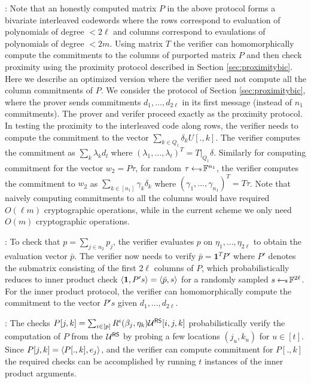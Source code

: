 : Note that an honestly computed
matrix $P$ in the above protocol forms a bivariate interleaved codewords where
the rows correspond to evaluation of polynomials of degree $<2\ell$ and columns
correspond to evaulations of polynomials of degree $<2m$. Using matrix $T$ the
verifier can homomorphically compute the commitments to the columns of
purported matrix $P$ and then check proximity using the proximity protocol
described in Section \ref{sec:proximitybic}. Here we describe an optimized
version where the verifier need not compute all the column commitments of $P$. 
We consider the protocol of Section \ref{sec:proximitybic}, where the prover
sends commitments $d_1,\ldots,d_{2\ell}$ in its first message (instead of $n_1$
commitments). The prover and verifer proceed exactly as the proximity protocol.
In testing the proximity to the interleaved code along rows, the verifier needs
to compute the commitment to the vector $\sum_{k\in Q_1}\delta_kU[.,k]$. The
verifier computes the commitment as $\sum_k\lambda_kd_l$ where
$(\lambda_1,\ldots,\lambda_t)^T = T|_{Q_1}\delta$. Similarly for computing
commitment for the vector $w_2=P\tau$, for random $\tau\hskip2.3pt{\gets\!\!\mbox{\tiny${\$}$\normalsize}}\, \mathbb{F}^{n_1}$, the
verifier computes the commitment to $w_2$ as $\sum_{k\in
[n_1]}\gamma_k\delta_k$ where $(\gamma_1,\ldots,\gamma_{n_1})^T=T\tau$. Note
that naively computing commitments to all the columns would have required
$O(\ell m)$ cryptographic operations, while in the current scheme we only need
$O(m)$ cryptographic operations.\smallskip

: To check that $p=\sum_{j\in
n_2}p_j$, the verifier evaluates $p$ on $\eta_1,\ldots,\eta_{2\ell}$ to obtain the
evaluation vector $\bar{p}$. The verifier now needs to verify
$\bar{p}=\bm{1}^TP'$ where $P'$ denotes the submatrix consisting of the first
$2\ell$ columns of $P$, which probabilistically reduces to inner product check
$\langle \bm{1},P's\rangle=\langle \bar{p},s\rangle$ for a randomly sampled $s\hskip2.3pt{\gets\!\!\mbox{\tiny${\$}$\normalsize}}\,
\mathbb{F}^{2\ell}$. For the inner product protocol, the verifier can homomorphically compute the commitment to the
vector $P's$ given $d_1,\ldots,d_{2\ell}$.\smallskip

: The checks
$P[j,k]=\sum_{i\in [p]} R^i(\beta_j,\eta_k)\mathcal{U}^{\mathsf{RS}}[i,j,k]$ probabilistically
verify the computation of $P$ from the $\mathcal{U}^{\mathsf{RS}}$ by probing a few locations
$(j_u,k_u)$ for $u\in [t]$. Since $P[j,k]=\langle P[.,k],e_j\rangle$, and the verifier
can compute commitment for $P[.,k]$ the required checks can be accomplished by
running $t$ instances of the inner product arguments.\smallskip


